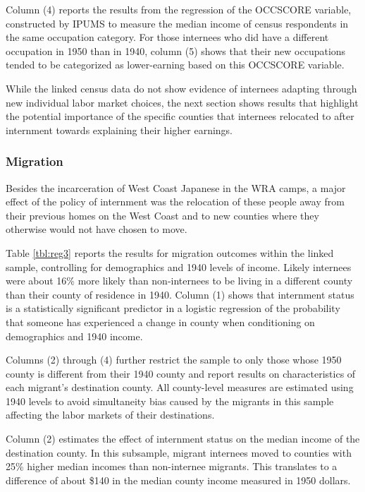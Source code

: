 \documentclass[12pt]{article}
\begin{document}
Column (4) reports the results from the regression of the OCCSCORE variable,
constructed by IPUMS to measure the median income of census respondents
in the same occupation category.
For those internees who did have a different occupation in 1950 than in 1940,
column (5) shows that their new occupations tended to be categorized
as lower-earning based on this OCCSCORE variable.

While the linked census data do not show evidence of internees
adapting through new individual labor market choices,
the next section shows results that highlight the potential importance of the
specific counties that internees relocated to after internment
towards explaining their higher earnings.
\subsubsection{Migration}
\label{sec:org3a65056}

Besides the incarceration of West Coast Japanese in the WRA camps,
a major effect of the policy of internment was the relocation of these people
away from their previous homes on the West Coast and to new counties
where they otherwise would not have chosen to move.



Table \ref{tbl:reg3} reports the results for migration outcomes within the
linked sample,
controlling for demographics and 1940 levels of income.
Likely internees were about 16\% more likely than non-internees
to be living in a different county than their county of residence in 1940.
Column (1) shows that internment status is a statistically significant predictor
in a logistic regression
of the probability that someone has experienced a change in county
when conditioning on demographics and 1940 income.

Columns (2) through (4) further restrict the sample to only those whose
1950 county is different from their 1940 county and report results on
characteristics of each migrant's destination county.
All county-level measures are estimated using 1940 levels
to avoid simultaneity bias caused by the migrants in this sample affecting
the labor markets of their destinations.

Column (2) estimates the effect of internment status on the
median income of the destination county.
In this subsample, migrant internees moved to counties
with 25\% higher median incomes than non-internee migrants.
This translates to a difference of about \$140 in the median county income
measured in 1950 dollars.
\end{document}
